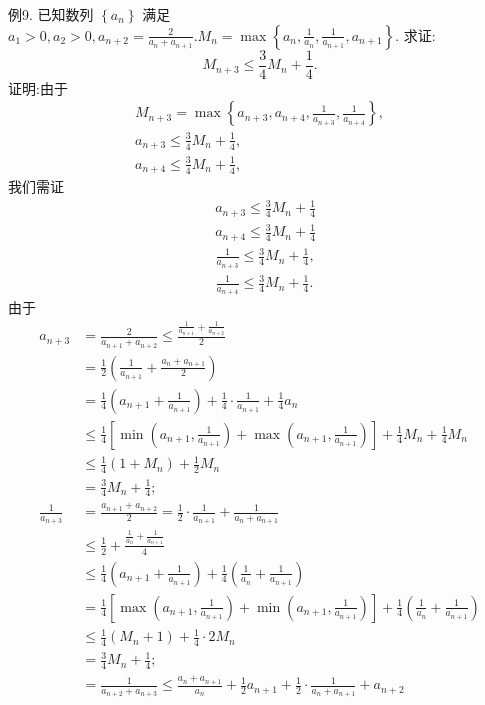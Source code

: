 例9. 已知数列 $\left\{a_n\right\}$ 满足 $a_1>0, a_2>0, a_{n+2}=\frac{2}{a_n+a_{n+1}} . M_n= \max \left\{a_n, \frac{1}{a_n}, \frac{1}{a_{n+1}}, a_{n+1}\right\}$. 求证:
$$
M_{n+3} \leqslant \frac{3}{4} M_n+\frac{1}{4} .
$$
证明:由于
$$
\begin{gathered}
M_{n+3}=\max \left\{a_{n+3}, a_{n+4}, \frac{1}{a_{n+3}}, \frac{1}{a_{n+4}}\right\}, \\
a_{n+3} \leqslant \frac{3}{4} M_n+\frac{1}{4}, \\
a_{n+4} \leqslant \frac{3}{4} M_n+\frac{1}{4},
\end{gathered}
$$
我们需证
$$
\begin{aligned}
& a_{n+3} \leqslant \frac{3}{4} M_n+\frac{1}{4} \\
& a_{n+4} \leqslant \frac{3}{4} M_n+\frac{1}{4}
\end{aligned}
$$
$$
\begin{aligned}
& \frac{1}{a_{n+3}} \leqslant \frac{3}{4} M_n+\frac{1}{4}, \\
& \frac{1}{a_{n+4}} \leqslant \frac{3}{4} M_n+\frac{1}{4} .
\end{aligned}
$$
由于
$$
\begin{aligned}
a_{n+3} & =\frac{2}{a_{n+1}+a_{n+2}} \leqslant \frac{\frac{1}{a_{n+1}}+\frac{1}{a_{n+2}}}{2} \\
& =\frac{1}{2}\left(\frac{1}{a_{n+1}}+\frac{a_n+a_{n+1}}{2}\right) \\
& =\frac{1}{4}\left(a_{n+1}+\frac{1}{a_{n+1}}\right)+\frac{1}{4} \cdot \frac{1}{a_{n+1}}+\frac{1}{4} a_n \\
& \leqslant \frac{1}{4}\left[\min \left(a_{n+1}, \frac{1}{a_{n+1}}\right)+\max \left(a_{n+1}, \frac{1}{a_{n+1}}\right)\right]+\frac{1}{4} M_n+\frac{1}{4} M_n \\
& \leqslant \frac{1}{4}\left(1+M_n\right)+\frac{1}{2} M_n \\
& =\frac{3}{4} M_n+\frac{1}{4} ; \\
\frac{1}{a_{n+3}} & =\frac{a_{n+1}+a_{n+2}}{2}=\frac{1}{2} \cdot \frac{1}{a_{n+1}}+\frac{1}{a_n+a_{n+1}} \\
& \leqslant \frac{1}{2}+\frac{\frac{1}{a_n}+\frac{1}{a_{n+1}}}{4} \\
& \leqslant \frac{1}{4}\left(a_{n+1}+\frac{1}{a_{n+1}}\right)+\frac{1}{4}\left(\frac{1}{a_n}+\frac{1}{a_{n+1}}\right) \\
& =\frac{1}{4}\left[\max \left(a_{n+1}, \frac{1}{a_{n+1}}\right)+\min \left(a_{n+1}, \frac{1}{a_{n+1}}\right)\right]+\frac{1}{4}\left(\frac{1}{a_n}+\frac{1}{a_{n+1}}\right) \\
& \leqslant \frac{1}{4}\left(M_n+1\right)+\frac{1}{4} \cdot 2 M_n \\
& =\frac{3}{4} M_n+\frac{1}{4} ; \\
& =\frac{1}{a_{n+2}+a_{n+3}} \leqslant \frac{a_n+a_{n+1}}{a_n}+\frac{1}{2} a_{n+1}+\frac{1}{2} \cdot \frac{1}{a_n+a_{n+1}}+a_{n+2}
\end{aligned}
$$
